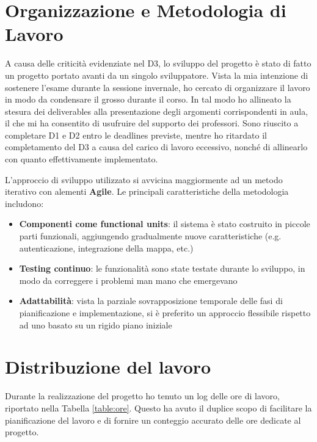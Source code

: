 \documentclass[9pt]{extarticle}
\begin{document}
\customtitle

\tableofcontents
\newpage

\section{Organizzazione e Metodologia di Lavoro}

A causa delle criticità evidenziate nel D3, lo sviluppo del progetto è stato
di fatto un progetto portato avanti da un singolo sviluppatore. Vista la mia
intenzione di sostenere l'esame durante la sessione invernale, ho cercato di
organizzare il lavoro in modo da condensare il grosso durante il corso. In tal
modo ho allineato la stesura dei deliverables alla presentazione degli
argomenti corrispondenti in aula, il che mi ha consentito di usufruire del
supporto dei professori. Sono riuscito a completare D1 e D2 entro le deadlines
previste, mentre ho ritardato il completamento del D3 a causa del carico di
lavoro eccessivo, nonché di allinearlo con quanto effettivamente implementato. \newline

L'approccio di sviluppo utilizzato si avvicina maggiormente ad un metodo iterativo con alementi \textbf{Agile}. Le principali caratteristiche della metodologia includono:
\begin{itemize}
	\item \textbf{Componenti come functional units}: il sistema è stato costruito in piccole parti funzionali, aggiungendo gradualmente nuove caratteristiche (e.g. autenticazione, integrazione della mappa, etc.)
	\item \textbf{Testing continuo}: le funzionalità sono state testate durante lo sviluppo, in modo da correggere i problemi man mano che emergevano
	\item \textbf{Adattabilità}: vista la parziale sovrapposizione temporale delle fasi di pianificazione e implementazione, si è preferito un approccio flessibile rispetto ad uno basato su un rigido piano iniziale
\end{itemize}



\section{Distribuzione del lavoro}

Durante la realizzazione del progetto ho tenuto un log delle ore di lavoro,
riportato nella Tabella \ref{table:ore}. Questo ha avuto il duplice scopo di
facilitare la pianificazione del lavoro e di fornire un conteggio accurato
delle ore dedicate al progetto.
\end{document}
